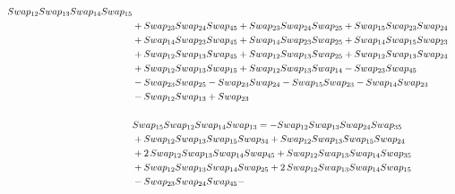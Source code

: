 \documentclass[10pt,a4paper]{amsart}
\begin{document}
\begin{align*}
        \textnormal{Swap}_{12} \textnormal{Swap}_{13} \textnormal{Swap}_{14} \textnormal{Swap}_{15} \\ & + \textnormal{Swap}_{23} \textnormal{Swap}_{24} \textnormal{Swap}_{45} + \textnormal{Swap}_{23} \textnormal{Swap}_{24} \textnormal{Swap}_{25} + \textnormal{Swap}_{15} \textnormal{Swap}_{23} \textnormal{Swap}_{24}\\& + \textnormal{Swap}_{14} \textnormal{Swap}_{23} \textnormal{Swap}_{45}
        + \textnormal{Swap}_{14} \textnormal{Swap}_{23} \textnormal{Swap}_{25} + \textnormal{Swap}_{14} \textnormal{Swap}_{15} \textnormal{Swap}_{23}\\ & + \textnormal{Swap}_{12} \textnormal{Swap}_{13} \textnormal{Swap}_{45} + \textnormal{Swap}_{12} \textnormal{Swap}_{13} \textnormal{Swap}_{25} + \textnormal{Swap}_{12} \textnormal{Swap}_{13} \textnormal{Swap}_{24}\\ & +
        \textnormal{Swap}_{12} \textnormal{Swap}_{13} \textnormal{Swap}_{15} + \textnormal{Swap}_{12} \textnormal{Swap}_{13} \textnormal{Swap}_{14} - \textnormal{Swap}_{23} \textnormal{Swap}_{45}\\ & - \textnormal{Swap}_{23} \textnormal{Swap}_{25} - \textnormal{Swap}_{23} \textnormal{Swap}_{24} - \textnormal{Swap}_{15} \textnormal{Swap}_{23} -
        \textnormal{Swap}_{14} \textnormal{Swap}_{23}\\ & - \textnormal{Swap}_{12} \textnormal{Swap}_{13} + \textnormal{Swap}_{23}\\
        \\
        &\textnormal{Swap}_{15}   \textnormal{Swap}_{12}   \textnormal{Swap}_{14}   \textnormal{Swap}_{13} = -\textnormal{Swap}_{12} \textnormal{Swap}_{13} \textnormal{Swap}_{24} \textnormal{Swap}_{35}\\ & + \textnormal{Swap}_{12} \textnormal{Swap}_{13} \textnormal{Swap}_{15} \textnormal{Swap}_{34} + \textnormal{Swap}_{12} \textnormal{Swap}_{13} \textnormal{Swap}_{15} \textnormal{Swap}_{24}\\ & + 2\,\textnormal{Swap}_{12} \textnormal{Swap}_{13} \textnormal{Swap}_{14} \textnormal{Swap}_{45} +
        \textnormal{Swap}_{12} \textnormal{Swap}_{13} \textnormal{Swap}_{14} \textnormal{Swap}_{35}\\ & + \textnormal{Swap}_{12} \textnormal{Swap}_{13} \textnormal{Swap}_{14} \textnormal{Swap}_{25} + 2\,\textnormal{Swap}_{12} \textnormal{Swap}_{13} \textnormal{Swap}_{14} \textnormal{Swap}_{15}\\ & - \textnormal{Swap}_{23} \textnormal{Swap}_{24} \textnormal{Swap}_{45} -

\end{align*}
\end{document}
